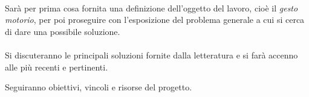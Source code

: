 {\bfseries
\vspace{1in}

\paragraph{}
Sarà per prima cosa fornita una definizione dell'oggetto del lavoro,
cioè il \emph{gesto motorio}, per poi proseguire con l'esposizione del problema generale
a cui si cerca di dare una possibile soluzione.


\paragraph{}
Si discuteranno le principali soluzioni fornite dalla letteratura
e si farà accenno alle più recenti e pertinenti.

\par{}
Seguiranno obiettivi, vincoli e risorse del progetto.

\vfill
}